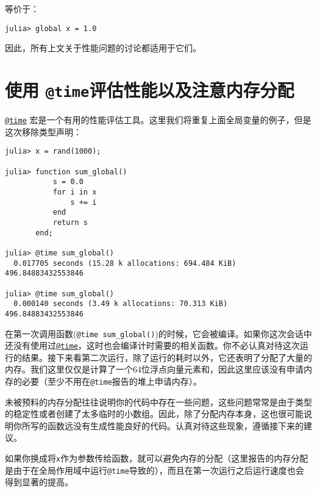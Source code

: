 等价于：




\begin{verbatim}
julia> global x = 1.0
\end{verbatim}



因此，所有上文关于性能问题的讨论都适用于它们。



\hypertarget{1547856480373223464}{}


\section{使用 \texttt{@time}评估性能以及注意内存分配}



\hyperlink{8029752041511656628}{\texttt{@time}} 宏是一个有用的性能评估工具。这里我们将重复上面全局变量的例子，但是这次移除类型声明：




\begin{verbatim}
julia> x = rand(1000);

julia> function sum_global()
           s = 0.0
           for i in x
               s += i
           end
           return s
       end;

julia> @time sum_global()
  0.017705 seconds (15.28 k allocations: 694.484 KiB)
496.84883432553846

julia> @time sum_global()
  0.000140 seconds (3.49 k allocations: 70.313 KiB)
496.84883432553846
\end{verbatim}



在第一次调用函数(\texttt{@time sum\_global()})的时候，它会被编译。如果你这次会话中还没有使用过\hyperlink{8029752041511656628}{\texttt{@time}}，这时也会编译计时需要的相关函数。你不必认真对待这次运行的结果。接下来看第二次运行，除了运行的耗时以外，它还表明了分配了大量的内存。我们这里仅仅是计算了一个64位浮点向量元素和，因此这里应该没有申请内存的必要（至少不用在\texttt{@time}报告的堆上申请内存）。



未被预料的内存分配往往说明你的代码中存在一些问题，这些问题常常是由于类型的稳定性或者创建了太多临时的小数组。因此，除了分配内存本身，这也很可能说明你所写的函数远没有生成性能良好的代码。认真对待这些现象，遵循接下来的建议。



如果你换成将\texttt{x}作为参数传给函数，就可以避免内存的分配（这里报告的内存分配是由于在全局作用域中运行\texttt{@time}导致的），而且在第一次运行之后运行速度也会得到显著的提高。




